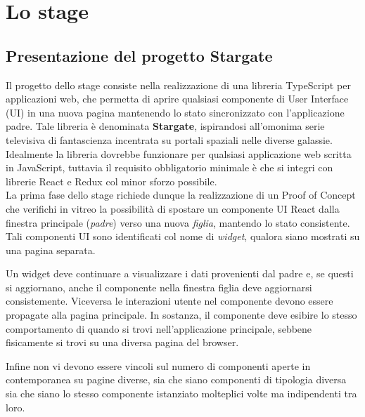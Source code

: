 
\chapter{Lo stage}
\label{cap:descrizione-stage}

\section{Presentazione del progetto Stargate}

Il progetto dello stage consiste nella realizzazione di una libreria \gls{TypeScript} per applicazioni web, che permetta di aprire qualsiasi componente di User Interface (UI) in una nuova pagina mantenendo lo stato sincronizzato con l'applicazione padre. Tale libreria è denominata \textbf{Stargate}, ispirandosi all'omonima serie televisiva di fantascienza incentrata su portali spaziali nelle diverse galassie. Idealmente la libreria dovrebbe funzionare per qualsiasi applicazione web scritta in \gls{JavaScript}, tuttavia il requisito obbligatorio minimale è che si integri con librerie \gls{React} e \gls{Redux} col minor sforzo possibile.\\

La prima fase dello stage richiede dunque la realizzazione di un Proof of Concept che verifichi in vitreo la possibilità di spostare un componente UI React dalla finestra principale (\textit{padre}) verso una nuova \textit{figlia}, mantendo lo stato consistente. Tali componenti UI sono identificati col nome di \textit{widget}, qualora siano mostrati su una pagina separata.

Un widget deve continuare a visualizzare i dati provenienti dal padre e, se questi si aggiornano, anche il componente nella finestra figlia deve aggiornarsi consistemente. Viceversa le interazioni utente nel componente devono essere propagate alla pagina principale. In sostanza, il componente deve esibire lo stesso comportamento di quando si trovi nell'applicazione principale, sebbene fisicamente si trovi su una diversa pagina del browser.

Infine non vi devono essere vincoli sul numero di componenti aperte in contemporanea su pagine diverse, sia che siano componenti di tipologia diversa sia che siano lo stesso componente istanziato molteplici volte ma indipendenti tra loro.\\


